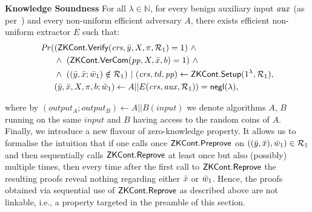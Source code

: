\begin{definition}[ZK Continuations]
\noindent \textbf{Knowledge Soundness} For all $\lambda \in \mathbb{N}$, for every benign auxiliary input $\mathit{aux}$ (as per~\cite{bening_auxiliary}) and 
every non-uniform efficient adversary $A$, there exists efficient non-uniform extractor $E$ such that:
\begin{align*}
\mathit{Pr} (& ({\mathsf{ZKCont}}.{\mathsf{Verify}}(\mathit{crs}, \bar{y}, X, \pi, \mathcal{R}_1) = 1) \ \wedge \ \\
                   & \wedge \ ({\mathsf{ZKCont}}.{\mathsf{VerCom}}(\mathit{pp}, X, \bar{x}, b) = 1) \ \wedge\ \\
                   & \wedge \ ( (\bar{y}, \bar{x}; \bar{w}_1) \notin \mathcal{R}_1) \ | \ (\mathit{crs}, \mathit{td}, \mathit{pp}) \leftarrow {\ensuremath{\mathsf{ZKCont}}}.{\mathsf{Setup}} (1^{\lambda}, \mathcal{R}_1), \\
                   & (\bar{y}, \bar{x}, X, \pi, b; \bar{w}_1 ) \leftarrow A || E (\mathit{crs}, \mathit{aux}, \mathcal{R}_1)) = \mathsf{negl} (\lambda),
\end{align*}

\begin{comment}
\begin{align*}
\mathit{Pr} (& (\ZKCont.\Verify(\crs, \bar{y}, X, \pi, \relone) = 1) \ \wedge \ (\ZKCont.\VerifyCom(\pp, X, \bar{x}, b) = 1) \ \wedge\ \\
                   & \wedge \ ( (\bary, \barx; \baromega_1) \notin \relone) \ | \ (\crs, \pp) \leftarrow \ZKCont.\Setup (1^{\lambda}), \\
                   & (\bary, \barx, X, \pi, b; \baromega_1 ) \leftarrow A || E (\crs, \realaux, \relone)) = \negl (\lambda),
\end{align*}
\end{comment}

\noindent %
where by $(\mathit{output_{A}};\mathit{output_{B}}) \leftarrow A || B(\mathit{input})$ we denote algorithms $A$, $B$ running on the same 
$\mathit{input}$ and $B$ having access to the random coins of $A$. \\

\noindent Finally, we introduce a new flavour of zero-knowledge property. It allows us to formalise the intuition that if one calls once 
${\mathsf{ZKCont}}.{\mathsf{Preprove}}$ on $((\bar{y}, \bar{x}), \bar{w}_1) \in \mathcal{R}_1$ and 
then sequentially calls $ {\mathsf{ZKCont}}.{\mathsf{Reprove}} $ at least once but also (possibly) multiple times, 
then every time after the first call to $ {\mathsf{ZKCont}}.{\mathsf{Reprove}} $ the resulting proofs reveal nothing regarding either $\bar{x}$ or $\bar{w}_1$. 
Hence, the proofs obtained via sequential use of $ {\mathsf{ZKCont}}.{\mathsf{Reprove}} $ as described above are not linkable, i.e., a property targeted  
in the preamble of this section. \\


\end{definition}

